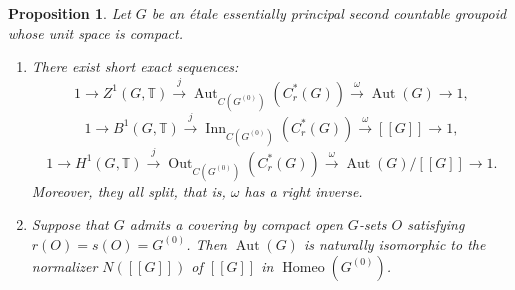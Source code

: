 \documentclass[11pt]{article}
\newtheorem{prop}[thm]{Proposition}
\theoremstyle{definition}
\newcommand{\Aut}{\operatorname{Aut}}
\newcommand{\Inn}{\operatorname{Inn}}
\newcommand{\Out}{\operatorname{Out}}
\newcommand{\Homeo}{\operatorname{Homeo}}
\newcommand{\T}{\mathbb{T}}
\begin{document}
\begin{prop}\label{exact2}
Let $G$ be an \'etale essentially principal second countable groupoid 
whose unit space is compact. 
\begin{enumerate}
\item There exist short exact sequences: 
\[
1\longrightarrow Z^1(G,\T)\stackrel{j}{\longrightarrow}
\Aut_{C(G^{(0)})}(C^*_r(G))\stackrel{\omega}{\longrightarrow}
\Aut(G)\longrightarrow1, 
\]
\[
1\longrightarrow B^1(G,\T)\stackrel{j}{\longrightarrow}
\Inn_{C(G^{(0)})}(C^*_r(G))\stackrel{\omega}{\longrightarrow}
[[G]]\longrightarrow1, 
\]
\[
1\longrightarrow H^1(G,\T)\stackrel{j}{\longrightarrow}
\Out_{C(G^{(0)})}(C^*_r(G))\stackrel{\omega}{\longrightarrow}
\Aut(G)/[[G]]\longrightarrow1. 
\]
Moreover, they all split, that is, $\omega$ has a right inverse. 
\item 
Suppose that $G$ admits a covering by compact open $G$-sets $O$ 
satisfying $r(O)=s(O)=G^{(0)}$. 
Then $\Aut(G)$ is naturally isomorphic to 
the normalizer $N([[G]])$ of $[[G]]$ in $\Homeo(G^{(0)})$. 
\end{enumerate}
\end{prop}
\end{document}
